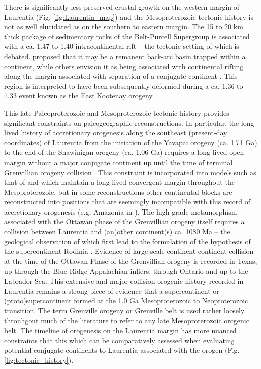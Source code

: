 \documentclass[11pt,letterpaper]{article}
\begin{document}
There is significantly less preserved crustal growth on the western margin of Laurentia (Fig. \ref{fig:Laurentia_map}) and the Mesoproterozoic tectonic history is not as well elucidated as on the southern to eastern margin. The 15 to 20 km thick package of sedimentary rocks of the Belt-Purcell Supergroup is associated with a ca. 1.47 to 1.40 intracontinental rift -- the tectonic setting of which is debated. \citet{Hoffman1989a} proposed that it may be a remanent back-arc basin trapped within a continent, while others envision it as being associated with continental rifting along the margin associated with separation of a conjugate continent \citep{Jones2015a}. This region is interpreted to have been subsequently deformed during a ca. 1.36 to 1.33 event known as the East Kootenay orogeny \citep{McMechan1982a, Nesheim2012a, McFarlane2015a}. 

This late Paleoproterozoic and Mesoproterozoic tectonic history provides significant constraints on paleogeographic reconstructions. In particular, the long-lived history of accretionary orogenesis along the southeast (present-day coordinates) of Laurentia from the initiation of the Yavapai orogeny (ca. 1.71 Ga) to the end of the Shawinigan orogeny (ca. 1.06 Ga) requires a long-lived open margin without a major conjugate continent up until the time of terminal Grenvillian orogeny collision \citep{Karlstrom2001a}. This constraint is incorporated into models such as that of \citet{Zhang2012a} and \citet{Pehrsson2015a} which maintain a long-lived convergent margin throughout the Mesoproterozoic, but in some reconstructions other continental blocks are reconstructed into positions that are seemingly incompatible with this record of accretionary orogenesis (e.g. Amazonia in \citealp{Elming2009a}). The high-grade metamorphism associated with the Ottawan phase of the Grenvillian orogeny itself requires a collision between Laurentia and (an)other continent(s) ca. 1080 Ma -- the geological observation of which first lead to the formulation of the hypothesis of the supercontinent Rodinia \citep{Hoffman1991a}. Evidence of large-scale continent-continent collision at the time of the Ottawan Phase of the Grenvillian orogeny is recorded in Texas, up through the Blue Ridge Appalachian inliers, through Ontario and up to the Labrador Sea. This extensive and major collision orogenic history recorded in Laurentia remains a strong piece of evidence that a supercontinent or (proto)supercontinent formed at the 1.0 Ga Mesoproterozoic to Neoproterozoic transition. The term Grenville orogeny or Grenville belt is used rather loosely throuhgout much of the literature to refer to any late Mesoproterozoic orogenic belt. The timeline of orogenesis on the Laurentia margin has more nuanced constraints that this which can be comparatively assessed when evaluating potential conjugate continents to Laurentia associated with the orogen (Fig. \ref{fig:tectonic_history}).
\end{document}
